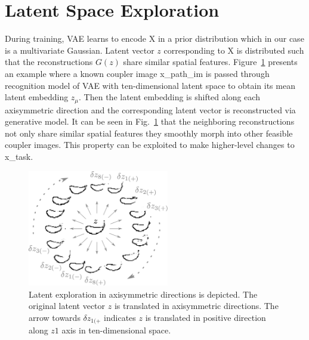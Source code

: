 \section{Latent Space Exploration}
During training, VAE learns to encode \ac{X} in a prior distribution which in our case is a multivariate Gaussian. Latent vector $z$ corresponding to \ac{X} is distributed such that the reconstructions $G(z)$ share similar spatial features. Figure~\ref{fig_latent_space_interactions} presents an example where a known coupler image \ac{x_path_im} is passed through recognition model of VAE with ten-dimensional latent space to obtain its mean latent embedding $z_{\mu}$. Then the latent embedding is shifted along each axisymmetric direction and the corresponding latent vector is reconstructed via generative model. It can be seen in Fig.~\ref{fig_latent_space_interactions} that the neighboring reconstructions not only share similar spatial features they smoothly morph into other feasible coupler images. This property can be exploited to make higher-level changes to \ac{x_task}.

\begin{figure}
\centering
\includegraphics[width=0.55\textwidth]{idetc-20/figure/fig_latent_exploration.eps}
  \caption{Latent exploration in axisymmetric directions is depicted. The original latent vector $z$ is translated in axisymmetric directions. The arrow towards $\delta z_{1(+}$ indicates $z$ is translated in positive direction along $z1$ axis in ten-dimensional space.}
\label{fig_latent_space_interactions}
\end{figure}

